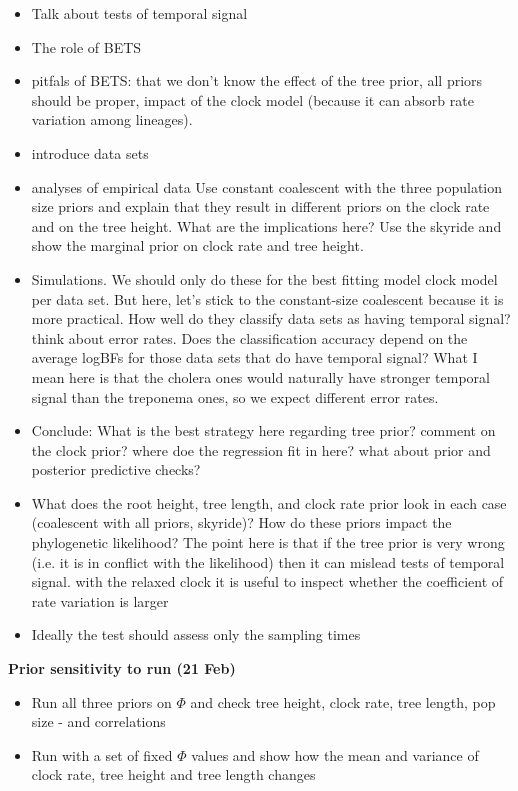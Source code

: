 \documentclass[11pt]{article}
\begin{document}
\begin{itemize}
	\item Talk about tests of temporal signal
	\item The role of BETS
	\item pitfals of BETS: that we don't know the effect of the tree prior, all priors should be proper, impact of the clock model (because it can absorb rate variation among lineages).
	\item introduce data sets
	\item analyses of empirical data
	\subitem Use constant coalescent with the three population size priors and explain that they result in different priors on the clock rate and on the tree height. What are the implications here?
	\subitem Use the skyride and show the marginal prior on clock rate and tree height.
	\item Simulations. We should only do these for the best fitting model clock model per data set. But here, let's stick to the constant-size coalescent because it is more practical. 
	\subitem How well do they classify data sets as having temporal signal? think about error rates.
	\subitem Does the classification accuracy depend on the average logBFs for those data sets that do have temporal signal? What I mean here is that the cholera ones would naturally have stronger temporal signal than the treponema ones, so we expect different error rates. 
	\item Conclude: What is the best strategy here regarding tree prior? comment on the clock prior? where doe the regression fit in here? what about prior and posterior predictive checks?
\end{itemize}

\begin{itemize}
	\item What does the root height, tree length, and clock rate prior look in each case (coalescent with all priors, skyride)?
	\subitem How do these priors impact the phylogenetic likelihood? The point here is that if the tree prior is very wrong (i.e. it is in conflict with the likelihood) then it can mislead tests of temporal signal.
	\subitem with the relaxed clock it is useful to inspect whether the coefficient of rate variation is larger
	\item Ideally the test should assess only the sampling times
	
\end{itemize}



\textbf{Prior sensitivity to run (21 Feb)}
\begin{itemize}
	\item Run all three priors on $\Phi$ and check
	\subitem tree height, clock rate, tree length, pop size - and correlations
	\item Run with a set of fixed $\Phi$ values and show how the mean and variance of clock rate, tree height and tree length changes 
\end{itemize}
\end{document}
